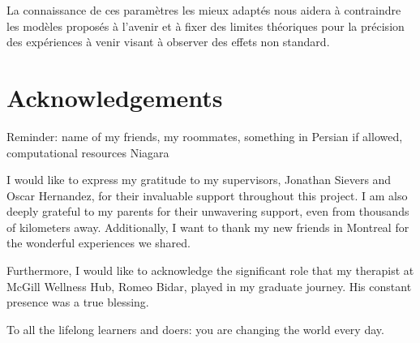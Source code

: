 \documentclass[12pt, TexShade, letterpaper]{report}
\begin{document}
La connaissance de ces paramètres les mieux adaptés nous aidera à contraindre les modèles proposés à l'avenir et à fixer des limites théoriques pour la précision des expériences à venir visant à observer des effets non standard.\par

\chapter*{Acknowledgements}
	\label{chap:acknowledgments}


Reminder: name of my friends, my roommates, something in Persian if allowed, computational resources Niagara \par 
I would like to express my gratitude to my supervisors, Jonathan Sievers and Oscar Hernandez, for their invaluable support throughout this project. I am also deeply grateful to my parents for their unwavering support, even from thousands of kilometers away. Additionally, I want to thank my new friends in Montreal for the wonderful experiences we shared.\par
Furthermore, I would like to acknowledge the significant role that my therapist at McGill Wellness Hub, Romeo Bidar, played in my graduate journey. His constant presence was a true blessing.\par
 To all the lifelong learners and doers: you are changing the world every day.
	\tableofcontents\thispagestyle{plain}

	\listoffigures\thispagestyle{plain}
	\listoftables
	\glsaddall
	\setlength\LTleft{0pt}
	\setlength\LTright{0pt}
	\setlength\glsdescwidth{0.8\hsize}
	\printglossary[title={List of Acronyms}]

 	\clearpage
	
	\glsresetall
\end{document}
